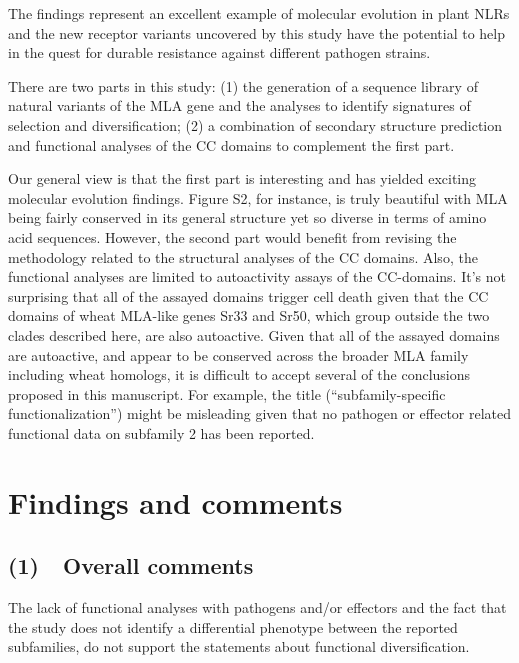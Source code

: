 \documentclass[10pt]{article}
\begin{document}
The findings represent an excellent example of molecular evolution in
plant NLRs and the new receptor variants uncovered by this study have
the potential to help in the quest for durable resistance against
different pathogen strains.

\par\null

There are two parts in this study: (1) the generation of a sequence
library of natural variants of the MLA gene and the analyses to identify
signatures of selection and diversification; (2) a combination of
secondary structure prediction and functional analyses of the CC domains
to complement the first part.

\par\null

Our general view is that the first part is interesting and has yielded
exciting molecular evolution findings. Figure S2, for instance, is truly
beautiful with MLA being fairly conserved in its general structure yet
so diverse in terms of amino acid sequences. However, the second part
would benefit from revising the methodology related to the structural
analyses of the CC domains. Also, the functional analyses are limited to
autoactivity assays of the CC-domains. It's not surprising that all of
the assayed domains trigger cell death given that the CC domains of
wheat MLA-like genes Sr33 and Sr50, which group outside the two clades
described here, are also autoactive. Given that all of the assayed
domains are autoactive, and appear to be conserved across the broader
MLA family including wheat homologs, it is difficult to accept several
of the conclusions proposed in this manuscript. For example, the title
(``subfamily-specific functionalization'') might be misleading given
that no pathogen or effector related functional data on subfamily 2 has
been reported.

\section*{\(\)Findings and
comments}

{\label{457509}}\par\null

\subsection*{(1)~~Overall comments}

{\label{408285}}

The lack of functional analyses with pathogens and/or effectors and the
fact that the study does not identify a differential phenotype between
the reported subfamilies, do not support the statements about functional
diversification.
\end{document}
